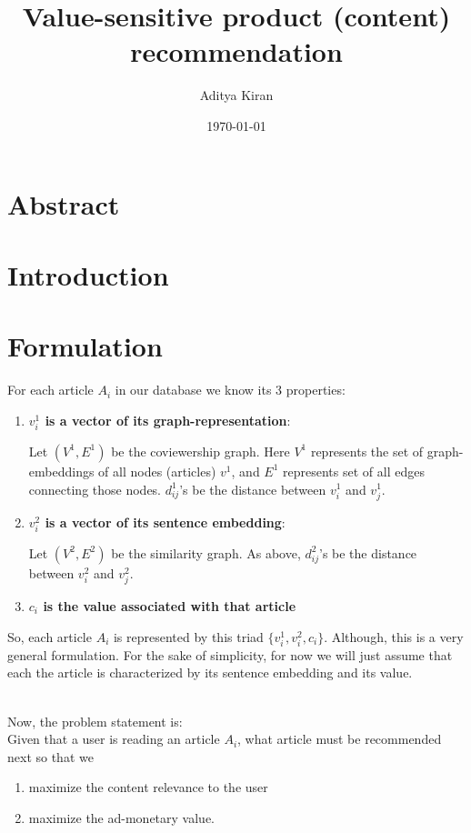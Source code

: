 \documentclass[11]{article}
\title{Value-sensitive product (content) recommendation}
\author{Aditya Kiran }
\date{\today}
\begin{document}
\maketitle
\section{Abstract}


\section{Introduction}

\section{Formulation}
For each article $A_i$ in our database we know its 3 properties:
\begin{enumerate}

\item \textbf{$v^1_i$ is a vector of its graph-representation}:

Let $(V^1, E^1)$ be the coviewership graph. Here $V^1$ represents the set of graph-embeddings of all nodes (articles) $v^1$, and $E^1$ represents set of all edges connecting those nodes.  $d^1_{ij}$'s be the distance between $v^1_i$ and $v^1_j$. 
 
\item \textbf{$v^2_i$ is a vector of its sentence embedding}:

Let $(V^2, E^2)$ be the similarity graph. As above, $d^2_{ij}$'s be the distance between $v^2_i$ and $v^2_j$.

\item \textbf{$c_i$ is the value associated with that article}
\end{enumerate}
So, each article $A_i$ is represented by this triad $\{ v^1_i, v^2_i, c_i \}$. Although, this is a very general formulation. For the sake of simplicity, for now we will just assume that each the article is characterized by its sentence embedding and its value.
\vspace{0.3cm}

\\
Now, the problem statement is: \\
Given that a user is reading an article $A_i$, what article must be recommended next so that we
\begin{enumerate}
\item maximize the content relevance to the user
\item maximize the ad-monetary value.
\end{enumerate} 
\end{document}
